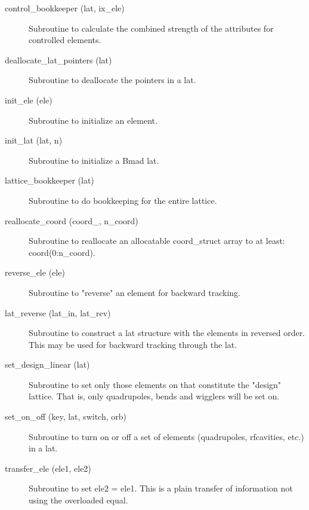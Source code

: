 \begin{description}

\item[control_bookkeeper (lat, ix_ele)] \Newline
Subroutine to calculate the combined strength of the attributes for
controlled elements.

\item[deallocate_lat_pointers (lat)] \Newline 
Subroutine to deallocate the pointers in a lat.

\item[init_ele (ele)] \Newline
Subroutine to initialize an element. 

\item[init_lat (lat, n)] \Newline 
Subroutine to initialize a Bmad lat.

\item[lattice_bookkeeper (lat)] \Newline 
Subroutine to do bookkeeping for the entire lattice.

\item[reallocate_coord (coord_, n_coord)] \Newline 
Subroutine to reallocate an allocatable  coord_struct array to at least:
coord(0:n_coord).

\item[reverse_ele (ele)] \Newline
Subroutine to "reverse" an element for backward tracking. 

\item[lat_reverse (lat_in, lat_rev)] \Newline
Subroutine to construct a lat structure with the elements in reversed 
order. This may be used for backward tracking through the lat. 

\item[set_design_linear (lat)] \Newline
Subroutine to set only those elements on that constitute the "design" 
lattice. That is, only quadrupoles, bends and wigglers will be set on. 

\item[set_on_off (key, lat, switch, orb)] \Newline
Subroutine to turn on or off a set of elements (quadrupoles,
rfcavities, etc.) in a lat.

\item[transfer_ele (ele1, ele2)] \Newline 
     Subroutine to set ele2 = ele1. 
     This is a plain transfer of information not using the overloaded equal.


\end{description}
